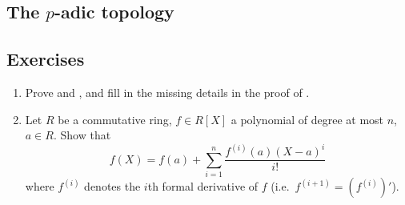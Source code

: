 \documentclass[12pt, leqno, british]{amsart}
\begin{document}
\subsection{The $p$-adic topology}

\subsection{Exercises}
\begin{enumerate}
\item Prove  and , and fill in the missing details in the proof of .
\item\label{ex:formal-Taylor} Let $R$ be a commutative ring, $f \in R[X]$ a polynomial of degree at most $n$, $a \in R$.
Show that
\begin{displaymath}
f(X) = f(a) + \sum_{i=1}^n \frac{f^{(i)}(a)(X-a)^i}{i!}
\end{displaymath}
where $f^{(i)}$ denotes the $i$th formal derivative of $f$ (i.e.~$f^{(i+1)} = (f^{(i)})'$).
\end{enumerate}
\end{document}
